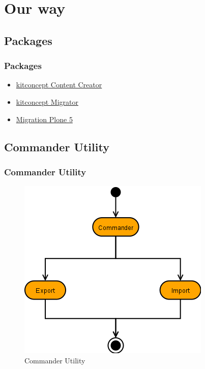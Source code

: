 \documentclass[aspectratio=169]{beamer}
\begin{document}
\section{Our way}
\subsection{Packages}
\begin{frame}
  \frametitle{Packages}
  \begin{itemize}
    \item \href{https://github.com/kitconcept/kitconcept.contentcreator}{kitconcept Content Creator} \pause
    \item \href{https://github.com/kitconcept/migration-plone5/tree/master/src/kitconcept.migrator}{kitconcept Migrator} \pause
    \item \href{https://github.com/kitconcept/migration-plone5}{Migration Plone 5}
  \end{itemize}
\end{frame}

\subsection{Commander Utility}
\begin{frame}
  \frametitle{Commander Utility}
  \begin{figure}
    \includegraphics[height=.7\textheight]{./src/img/006_-_Commander_Utility.png}
    \caption{Commander Utility}
  \end{figure}
\end{frame}
\end{document}
